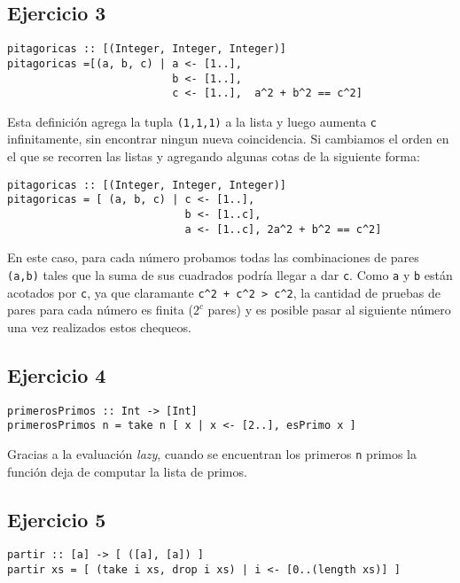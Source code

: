 \newpage
\subsection{Ejercicio 3}
\begin{centrado}
\begin{verbatim}
pitagoricas :: [(Integer, Integer, Integer)]
pitagoricas =[(a, b, c) | a <- [1..], 
                          b <- [1..], 
                          c <- [1..],  a^2 + b^2 == c^2]
\end{verbatim}
\end{centrado}

Esta definición agrega la tupla \texttt{(1,1,1)} a la lista y luego aumenta \texttt{c} infinitamente, sin encontrar ningun nueva coincidencia. Si cambiamos el orden en el que se recorren las listas y agregando algunas cotas de la siguiente forma:
\begin{centrado}
\begin{verbatim}
pitagoricas :: [(Integer, Integer, Integer)]
pitagoricas = [ (a, b, c) | c <- [1..], 
                            b <- [1..c],
                            a <- [1..c], 2a^2 + b^2 == c^2]
\end{verbatim}
\end{centrado}
En este caso, para cada número probamos todas las combinaciones de pares \texttt{(a,b)} tales que la suma de sus cuadrados podría llegar a dar \texttt{c}. Como \texttt{a} y \texttt{b} están acotados por \texttt{c}, ya que claramante \texttt{c^2 + c^2 > c^2}, la cantidad de pruebas de pares para cada número es finita ($2^c$ pares) y es posible pasar al siguiente número una vez realizados estos chequeos.


\subsection{Ejercicio 4}
\begin{centrado}
\begin{verbatim}
primerosPrimos :: Int -> [Int]
primerosPrimos n = take n [ x | x <- [2..], esPrimo x ]
\end{verbatim}
\end{centrado}

Gracias a la evaluación \textit{lazy}, cuando se encuentran los primeros \texttt{n} primos la función deja de computar la lista de primos.

\subsection{Ejercicio 5}
\begin{centrado}
	\begin{verbatim}
partir :: [a] -> [ ([a], [a]) ]
partir xs = [ (take i xs, drop i xs) | i <- [0..(length xs)] ]
	\end{verbatim}
\end{centrado}

